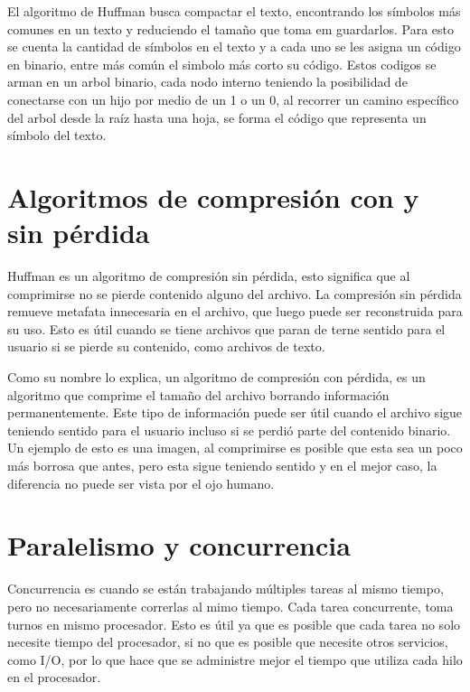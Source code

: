 \documentclass{report}
\begin{document}
El algoritmo de Huffman busca compactar el texto, encontrando los símbolos más comunes en un texto y reduciendo el tamaño que toma em guardarlos. Para esto se cuenta la cantidad de símbolos en el texto y a cada uno se les asigna un código en binario, entre más común el simbolo más corto su código. Estos codigos se arman en un arbol binario, cada nodo interno teniendo la posibilidad de conectarse con un hijo por medio de un 1 o un 0, al recorrer un camino específico del arbol desde la raíz hasta una hoja, se forma el código que representa un símbolo del texto. 



\section {Algoritmos de compresión con y sin pérdida}

Huffman es un algoritmo de compresión sin pérdida, esto significa que al comprimirse no se pierde contenido alguno del archivo.
La compresión sin pérdida remueve metafata innecesaria en el archivo, que luego puede ser reconstruida para su uso.
Esto es útil cuando se tiene archivos que paran de terne sentido para el usuario si se pierde su contenido, como archivos de texto.

Como su nombre lo explica, un algoritmo de compresión con pérdida, es un algoritmo que comprime el tamaño del archivo borrando información permanentemente.
Este tipo de información puede ser útil cuando el archivo sigue teniendo sentido para el usuario incluso si se perdió parte del contenido binario.
Un ejemplo de esto es una imagen,  al comprimirse es posible que esta sea un poco más borrosa que antes, pero esta sigue teniendo sentido y en el mejor caso, la diferencia no puede ser vista por el ojo humano.


\section{Paralelismo y concurrencia}

Concurrencia es cuando se están trabajando múltiples tareas al mismo tiempo, pero no necesariamente correrlas al mimo tiempo.
Cada tarea concurrente, toma turnos en mismo procesador. Esto es útil ya que es posible que cada tarea no solo necesite tiempo del procesador, si no que es posible que necesite otros servicios, como I/O, por lo que hace que se administre mejor el tiempo que utiliza cada hilo en el procesador. 
\end{document}
